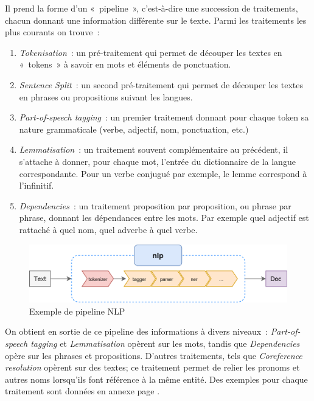 Il prend la forme d'un «~pipeline~», c'est-à-dire une succession de traitements, chacun donnant une information différente sur le texte. Parmi les traitements les plus courants on trouve~:
\begin{enumerate}
    \item \textit{Tokenisation}~: un pré-traitement qui permet de découper les textes en «~tokens~» à savoir en mots et éléments de ponctuation.
    \vspace{5pt}
    \item \textit{Sentence Split}~: un second pré-traitement qui permet de découper les textes en phrases ou propositions suivant les langues.
    \vspace{5pt}
    \item \textit{Part-of-speech tagging}~: un premier traitement donnant pour chaque token sa nature grammaticale (verbe, adjectif, nom, ponctuation, etc.)
    \vspace{5pt}
    \item \textit{Lemmatisation}~: un traitement souvent complémentaire au précédent, il s'attache à donner, pour chaque mot, l'entrée du dictionnaire de la langue correspondante. Pour un verbe conjugué par exemple, le lemme correspond à l'infinitif.
    \vspace{5pt}
    \item \textit{Dependencies}~: un traitement proposition par proposition, ou phrase par phrase, donnant les dépendances entre les mots. Par exemple quel adjectif est rattaché à quel nom, quel adverbe à quel verbe.
\end{enumerate}
\vspace{10pt}

\begin{figure}[H]
    \centering
    \includegraphics[scale=0.34]{images/Pipeline-example.png}
    \caption{Exemple de pipeline NLP}
    \label{fig:nlp-pipeline-example}
\end{figure}

\vspace{10pt}

On obtient en sortie de ce pipeline des informations à divers niveaux~: \textit{Part-of-speech tagging} et \textit{Lemmatisation} opèrent sur les mots, tandis que \textit{Dependencies} opère sur les phrases et propositions. D'autres traitements, tels que \textit{Coreference resolution} opèrent sur des textes; ce traitement permet de relier les pronoms et autres noms lorsqu'ils font référence à la même entité. Des exemples pour chaque traitement sont données en annexe page \pageref{nlp-exemple}.
\newline

